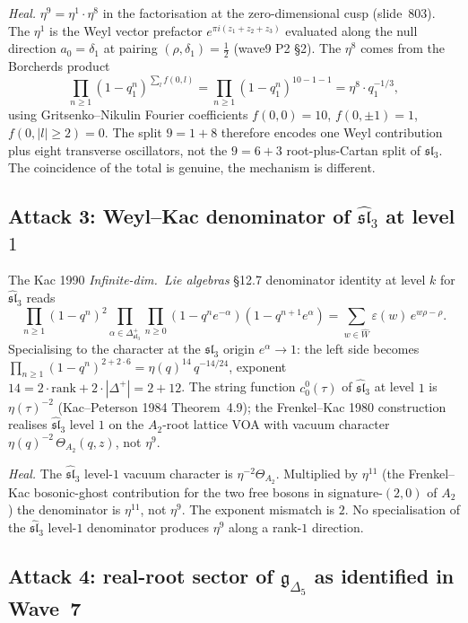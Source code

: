 \documentclass[12pt]{article}
\providecommand{\gDelta}{\mathfrak{g}_{\Delta_5}}
\providecommand{\slhat}[1]{\widehat{\mathfrak{sl}}_{#1}}
\providecommand{\sl}[1]{\mathfrak{sl}_{#1}}
\begin{document}
\emph{Heal.} $\eta^9 = \eta^1 \cdot \eta^8$ in the factorisation
at the zero-dimensional cusp (slide~803). The $\eta^1$ is the
Weyl vector prefactor $e^{\pi i(z_1+z_2+z_3)}$ evaluated along
the null direction $a_0 = \delta_1$ at pairing $(\rho,\delta_1)
= \tfrac{1}{2}$ (wave9 P2 \S2). The $\eta^8$ comes from the
Borcherds product
\[
  \prod_{n \geq 1}(1 - q_1^n)^{\sum_l f(0,l)}
  = \prod_{n \geq 1}(1 - q_1^n)^{10 - 1 - 1} = \eta^8 \cdot q_1^{-1/3},
\]
using Gritsenko--Nikulin Fourier coefficients $f(0,0) = 10$,
$f(0,\pm 1) = 1$, $f(0,|l|\geq 2) = 0$. The split $9 = 1 + 8$
therefore encodes one Weyl contribution plus eight transverse
oscillators, not the $9 = 6 + 3$ root-plus-Cartan split of
$\sl{3}$. The coincidence of the total is genuine, the
mechanism is different.

\subsection*{Attack 3: Weyl--Kac denominator of $\slhat{3}$ at level $1$}

The Kac 1990 \emph{Infinite-dim.\ Lie algebras} \S 12.7
denominator identity at level $k$ for $\slhat{3}$ reads
\[
  \prod_{n \geq 1}(1-q^n)^2 \prod_{\alpha \in \Delta^+_{\sl{3}}}
    \prod_{n \geq 0}(1 - q^n e^{-\alpha})(1 - q^{n+1} e^{\alpha})
  = \sum_{w \in \widehat{W}} \varepsilon(w)\, e^{w \rho - \rho}.
\]
Specialising to the character at the $\sl{3}$ origin $e^{\alpha} \to 1$:
the left side becomes $\prod_{n \geq 1}(1-q^n)^{2 + 2 \cdot 6} =
\eta(q)^{14}\,q^{-14/24}$, exponent $14 = 2 \cdot \mathrm{rank}
+ 2 \cdot |\Delta^+| = 2 + 12$. The string function $c^0_0(\tau)$
of $\slhat{3}$ at level $1$ is $\eta(\tau)^{-2}$ (Kac--Peterson
1984 Theorem~4.9); the Frenkel--Kac 1980 construction realises
$\slhat{3}$ level $1$ on the $A_2$-root lattice VOA with vacuum
character $\eta(q)^{-2}\,\Theta_{A_2}(q,z)$, not $\eta^9$.

\emph{Heal.} The $\slhat{3}$ level-$1$ vacuum character is
$\eta^{-2}\Theta_{A_2}$. Multiplied by $\eta^{11}$ (the
Frenkel--Kac bosonic-ghost contribution for the two free bosons
in signature-$(2,0)$ of $A_2$) the denominator is $\eta^{11}$,
not $\eta^9$. The exponent mismatch is $2$. No specialisation of
the $\slhat{3}$ level-$1$ denominator produces $\eta^9$ along a
rank-$1$ direction.

\subsection*{Attack 4: real-root sector of $\gDelta$ as identified in Wave~7}
\end{document}
